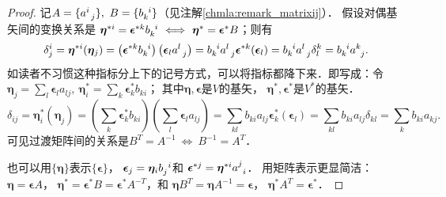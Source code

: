 \begin{proof}
    记$A=\{a^{i}_{\hphantom{a} j}\},\ B=\{b^{\hphantom{a} i} _k\}$（见注解\ref{chmla:remark_matrixij}）．
    假设对偶基矢间的变换关系是
    $\boldsymbol{\eta}^{*i} = \boldsymbol{\epsilon}^{*k} b^{\hphantom{a} i} _k 
    \ \Longleftrightarrow \  \boldsymbol{\eta}^{*}=\boldsymbol{\epsilon}^{*} B$；则有
    \begin{equation}\label{chmla:eqn_inv-cov-base}
        \delta^i _j = \boldsymbol{\eta}^{*i}(\boldsymbol{\eta}_j) =
        \left( \boldsymbol{\epsilon}^{*k} b^{\hphantom{a} i} _k \right)
        \left( \boldsymbol{\epsilon}_l a^{l}_{\hphantom{a} j}  \right) =
        b^{\hphantom{a} i} _k   a^{l}_{\hphantom{a} j}
        \boldsymbol{\epsilon}^{*k}(\boldsymbol{\epsilon}_l) =
        b^{\hphantom{a} i} _k   a^{l}_{\hphantom{a} j}  \delta^k_l =
        b^{\hphantom{a} i} _k   a^{k}_{\hphantom{a} j}.
    \end{equation}
    如读者不习惯这种指标分上下的记号方式，可以将指标都降下来．即写成：令
    $\boldsymbol{\eta}_j = \sum_{l}\boldsymbol{\epsilon}_l a_{lj},\
    \boldsymbol{\eta}^{*}_i =\sum_{k} \boldsymbol{\epsilon}^{*}_k b_{ki}$；
    其中$\boldsymbol{\eta},\boldsymbol{\epsilon}$是$V$的基矢，
    $\boldsymbol{\eta}^{*},\boldsymbol{\epsilon}^{*}$是$V^*$的基矢．
    \begin{equation*}
        \delta_{ij} = \boldsymbol{\eta}^{*}_i(\boldsymbol{\eta}_j) =
        \left( \sum_{k} \boldsymbol{\epsilon}^{*}_k b_{ki} \right)
        \left( \sum_{l} \boldsymbol{\epsilon}_l a_{lj} \right) =
        \sum_{kl} b_{ki}  a_{lj}
        \boldsymbol{\epsilon}^{*}_k(\boldsymbol{\epsilon}_l) =
        \sum_{kl} b_{ki}  a_{lj}  \delta_{kl} =
        \sum_{k} b_{ki}  a_{kj}.
    \end{equation*}
    可见过渡矩阵间的关系是$B^T=A^{-1} \ \Longleftrightarrow \ B^{-1} = A^T$．

    也可以用$\{\boldsymbol{\eta}\}$表示$\{\boldsymbol{\epsilon}\}$，
    $\boldsymbol{\epsilon}_j=\boldsymbol{\eta}_i b_j ^{\hphantom{a} i}$和
    $\boldsymbol{\epsilon}^{*j}=\boldsymbol{\eta}^{*i} a_{\hphantom{a} i} ^{j}$．
    用矩阵表示更显简洁：$\boldsymbol{\eta}=\boldsymbol{\epsilon}A$，
    $\boldsymbol{\eta}^{*}=\boldsymbol{\epsilon}^{*}B=\boldsymbol{\epsilon}^{*}A^{-T}$，和
    $\boldsymbol{\eta}B^T=\boldsymbol{\eta}A^{-1}=\boldsymbol{\epsilon}$，
    $\boldsymbol{\eta}^{*}A^T=\boldsymbol{\epsilon}^{*}$．
\end{proof}

